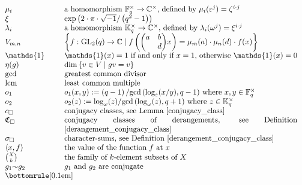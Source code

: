 \documentclass[12pt, reqno]{amsart}
\theoremstyle{definition}
\theoremstyle{remark}
\numberwithin{equation}{section}
\newcommand{\BC}{\mathbb{C}}
\newcommand{\BF}{\mathbb{F}}
\newcommand{\BK}{\mathbb{K}}
\newcommand{\pt}[1]{\left(#1\right)}
\newcommand{\cb}[1]{\left\{#1\right\}}
\newcommand{\jk}[1]{\left\langle#1\right\rangle}
\newcommand{\fC}{\mathfrak{C}}
\newcommand{\GL}{\mathrm{GL}}
\newcommand{\jz}[4]{{\begin{pmatrix}
		#1&#2\\
		#3&#4
\end{pmatrix}}}
\newcommand{\one}{\mathds{1}}
\newcommand{\lcm}{\mathrm{lcm}}
\begin{document}
\[\begin{tabular}{p{2.3cm}p{10.7cm}}
	$\mu_i$ & a homomorphism $\BF_q^\times \rightarrow \BC^\times$, defined by $\mu_i(\varepsilon^j) = \zeta^{i \cdot j}$ \\
	
	$\xi$  & $\exp\pt{{2\cdot\pi\cdot\sqrt{-1}}/\pt{q^2 - 1}}$  \\
	
	$\lambda_i$ & a homomorphism $\BK_q^\times \rightarrow \BC^\times$, defined by $\lambda_i(\omega^j) = \xi^{i \cdot j}$ \\
	
	$V_{m, n}$ & $\cb{f: \GL_2(q) \rightarrow \BC \;|\;  f\pt{\jz{a}{b}{}{d}x} = \mu_m(a)\cdot\mu_n(d)\cdot f(x)}$ \\
	
	$\one$ & $\one(x) = 1$ if and only if $x = 1$, otherwise $\one(x) = 0$ \\
	
	$\eta(g)$ & $\dim\cb{v \in V \;|\; gv = v}$ \\
	
	$\gcd$  & greatest common divisor  \\
	
	$\lcm$ & least common multiple \\
	
	$o_1$  & $o_1(x, y) := \pt{q - 1}/{\gcd\pt{\log_\varepsilon(x/y), q - 1}}$ where $x, y \in \BF_q^\times$  \\
	
	$o_2$ & $o_2(z) := {\log_\omega(z)}/{\gcd\pt{\log_\omega(z), q + 1}}$ where $z \in \BK_q^\times$ \\
	
	$c_\square$ & conjugacy classes, see Lemma \ref{conjugacy_class} \\
	
	$\fC_\square$ & conjugacy classes of derangements, see Definition \ref{derangement_conjugacy_class} \\
	
	$\sigma_\square$ & character-sums, see Definition \ref{derangement_conjugacy_class} \\
	
	$\jk{x, f}$ & the value of the function $f$ at $x$ \\
	
	$\binom{X}{k}$ & the family of $k$-element subsets of $X$ \\
	
	$g_1 {\sim} g_2$ & $g_1$ and $g_2$ are conjugate \\
	\bottomrule[0.1em]
\end{tabular}\]
\end{document}

